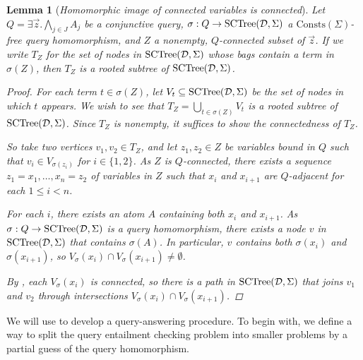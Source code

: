 \documentclass[12pt]{report}
\theoremstyle{plain}
\newtheorem{lemma}[theorem]{Lemma}
\theoremstyle{definition}
\def\Consts{{\mathrm{Consts}}}
\newcommand{\SCTree}[2]{\ensuremath{\normalfont{\textrm{SCTree}}\!\left( #1, #2 \right)}}
\begin{document}
\begin{lemma}[\emph{Homomorphic image of connected variables is connected}]
\label{lemma:image-of-connected-variables-is-connected}
  Let $Q = \exists \vec{z}. \bigwedge_{j \in J} A_j$ be a conjunctive query, $\sigma: Q \rightarrow \SCTree{\mathcal{D}}{\Sigma}$ a $\Consts(\Sigma)$-free query homomorphism, and $Z$ a nonempty, $Q$-connected subset of $\vec{z}$. If we write $T_Z$ for the set of nodes in $\SCTree{\mathcal{D}}{\Sigma}$ whose bags contain a term in $\sigma(Z)$, then $T_Z$ is a rooted subtree of $\SCTree{\mathcal{D}}{\Sigma}$.
  \begin{proof}
    For each term $t \in \sigma(Z)$, let $V_t \subseteq \SCTree{\mathcal{D}}{\Sigma}$ be the set of nodes in which $t$ appears. We wish to see that $T_Z = \bigcup_{t \in \sigma(Z)} V_t$ is a rooted subtree of $\SCTree{\mathcal{D}}{\Sigma}$. Since $T_Z$ is nonempty, it suffices to show the connectedness of $T_Z$.

    So take two vertices $v_1, v_2 \in T_Z$, and let $z_1, z_2 \in Z$ be variables bound in $Q$ such that $v_i \in V_{\sigma(z_i)}$ for $i \in \{1, 2\}$. As $Z$ is $Q$-connected, there exists a sequence $z_1 = x_1, \ldots, x_n = z_2$ of variables in $Z$ such that $x_i$ and $x_{i+1}$ are $Q$-adjacent for each $1 \leq i < n$.

    For each $i$, there exists an atom $A$ containing both $x_i$ and $x_{i+1}$. As \newline $\sigma: Q \rightarrow \SCTree{\mathcal{D}}{\Sigma}$ is a query homomorphism, there exists a node $v$ in $\SCTree{\mathcal{D}}{\Sigma}$ that contains $\sigma(A)$. In particular, $v$ contains both $\sigma(x_i)$ and $\sigma(x_{i+1})$, so $V_\sigma(x_i) \cap V_\sigma(x_{i+1}) \neq \emptyset$.

    By , each $V_\sigma(x_i)$ is connected, so there is a path in $\SCTree{\mathcal{D}}{\Sigma}$ that joins $v_1$ and $v_2$ through intersections $V_\sigma(x_i) \cap V_\sigma(x_{i+1})$.
  \end{proof}
\end{lemma}

We will use  to develop a query-answering procedure. To begin with, we define a way to split the query entailment checking problem into smaller problems by a partial guess of the query homomorphism.
\end{document}
